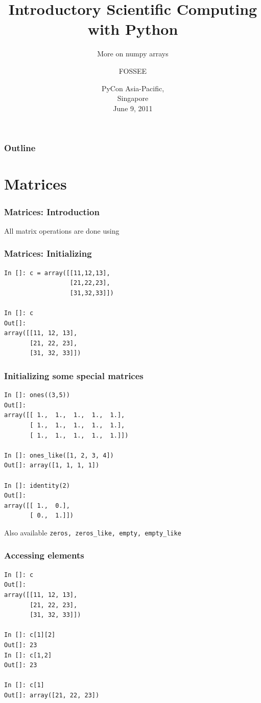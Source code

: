 \documentclass[14pt,compress]{beamer}
\title[More on numpy arrays]{Introductory Scientific Computing with
Python}
\subtitle{More on numpy arrays}
\author[Prabhu] {FOSSEE}
\institute[FOSSEE -- IITB] {Department of Aerospace Engineering\\IIT Bombay}
\date[] {PyCon Asia-Pacific,\\
Singapore\\
June 9, 2011
}
\newcommand{\typ}[1]{\lstinline{#1}}
\newcommand{\kwrd}[1]{ \texttt{\textbf{\color{blue}{#1}}}  }
\begin{document}
\begin{frame}
  \titlepage
\end{frame}

\begin{frame}
  \frametitle{Outline}
  \tableofcontents
\end{frame}

\section{Matrices}

\begin{frame}
\frametitle{Matrices: Introduction}
\alert{All matrix operations are done using \kwrd{arrays}}
\end{frame}

\begin{frame}[fragile]
\frametitle{Matrices: Initializing}
\begin{lstlisting}
In []: c = array([[11,12,13],
                  [21,22,23],
                  [31,32,33]])

In []: c
Out[]: 
array([[11, 12, 13],
       [21, 22, 23],
       [31, 32, 33]])
\end{lstlisting}
\end{frame}

\begin{frame}[fragile]
\frametitle{Initializing some special matrices}
\begin{small}
  \begin{lstlisting}
In []: ones((3,5))
Out[]: 
array([[ 1.,  1.,  1.,  1.,  1.],
       [ 1.,  1.,  1.,  1.,  1.],
       [ 1.,  1.,  1.,  1.,  1.]])

In []: ones_like([1, 2, 3, 4]) 
Out[]: array([1, 1, 1, 1])   

In []: identity(2)
Out[]: 
array([[ 1.,  0.],
       [ 0.,  1.]])
  \end{lstlisting}
Also available \alert{\typ{zeros, zeros_like, empty, empty_like}}
\end{small}
\end{frame}


\begin{frame}[fragile]
  \frametitle{Accessing elements}
  \begin{small}
  \begin{lstlisting}
In []: c
Out[]: 
array([[11, 12, 13],
       [21, 22, 23],
       [31, 32, 33]])

In []: c[1][2]
Out[]: 23
In []: c[1,2]
Out[]: 23

In []: c[1]
Out[]: array([21, 22, 23])
  \end{lstlisting}
  \end{small}
\end{frame}
\end{document}
